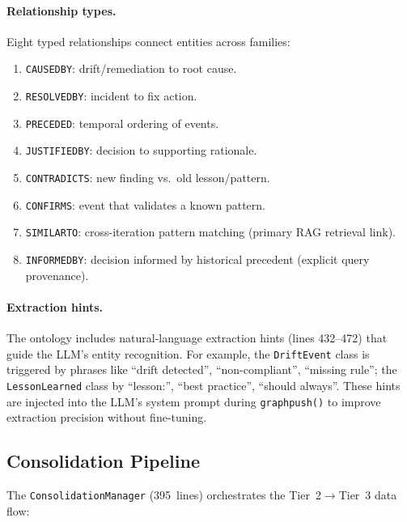 \documentclass[acmtog]{acmart}
\renewcommand\_{\textunderscore\allowbreak}
\begin{document}
\paragraph{Relationship types.}
Eight typed relationships connect entities across families:

\begin{enumerate}
  \item \texttt{CAUSED\_BY}: drift/remediation to root cause.
  \item \texttt{RESOLVED\_BY}: incident to fix action.
  \item \texttt{PRECEDED}: temporal ordering of events.
  \item \texttt{JUSTIFIED\_BY}: decision to supporting rationale.
  \item \texttt{CONTRADICTS}: new finding vs.\ old lesson/pattern.
  \item \texttt{CONFIRMS}: event that validates a known pattern.
  \item \texttt{SIMILAR\_TO}: cross-iteration pattern matching
    (primary RAG retrieval link).
  \item \texttt{INFORMED\_BY}: decision informed by historical
    precedent (explicit query provenance).
\end{enumerate}

\paragraph{Extraction hints.}
The ontology includes natural-language extraction hints (lines
432--472) that guide the LLM's entity recognition. For example,
the \texttt{DriftEvent} class is triggered by phrases like
``drift detected'', ``non-compliant'', ``missing rule''; the
\texttt{LessonLearned} class by ``lesson:'', ``best practice'',
``should always''. These hints are injected into the LLM's
system prompt during \texttt{graph\_push()} to improve extraction
precision without fine-tuning.


\subsection{Consolidation Pipeline}\label{sec:memory:consolidation}

The \texttt{ConsolidationManager} (395~lines) orchestrates the
Tier~2$\rightarrow$Tier~3 data flow:
\end{document}
